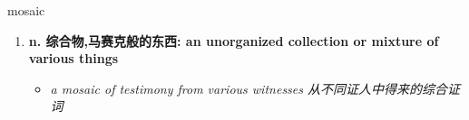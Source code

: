 
\begin{frame}
{\huge mosaic}
\begin{center}
\begin{enumerate}\Large
  \item \textbf{n. 综合物,马赛克般的东西: an unorganized collection or mixture of various things}
  \begin{itemize}
    \item \em{\Large{a mosaic of testimony from various witnesses 从不同证人中得来的综合证词}}
  \end{itemize}
\end{enumerate}
\end{center}
\end{frame}
